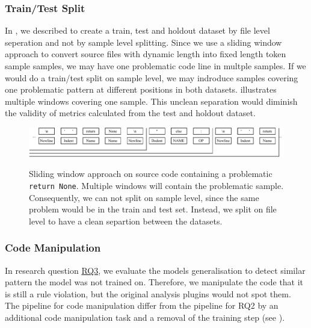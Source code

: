 \subsubsection{Train/Test Split}\label{sec:train_test_split}
In , we described to create a train, test and holdout dataset by file level seperation and not by sample level splitting.
Since we use a sliding window approach to convert source files with dynamic length into fixed length token sample samples, we may have one problematic code line in multple samples. If we would do a train/test split on sample level, we may indroduce samples covering one problematic pattern at different positions in both datasets.  illustrates multiple windows covering one sample. This unclean separation would diminish the validity of metrics calculated from the test and holdout dataset. 
\begin{figure}
    \includegraphics[width=1\textwidth]{img/ML/encoding_sliding_window_problem.pdf}
    \label{fig:encoding_sliding_window}
    \caption[Sliding window approach on source code containing a problematic \texttt{return None}]{Sliding window approach on source code containing a problematic \texttt{return None}. Multiple windows will contain the problematic sample. Consequently, we can not split on sample level, since the same problem would be in the train and test set. Instead, we split on file level to have a clean separtion between the datasets.}
\end{figure}

\subsubsection{Code Manipulation}\label{sec:approach_code_manipulation}
In research question \hyperref[rq:3]{RQ3}, we evaluate the models generalisation to detect similar pattern the model was not trained on. Therefore, we manipulate the code that it is still a rule violation, but the original analysis plugins would not spot them. The pipeline for code manipulation differ from the pipeline for RQ2 by an additional code manipulation task and a removal of the training step (see ).

